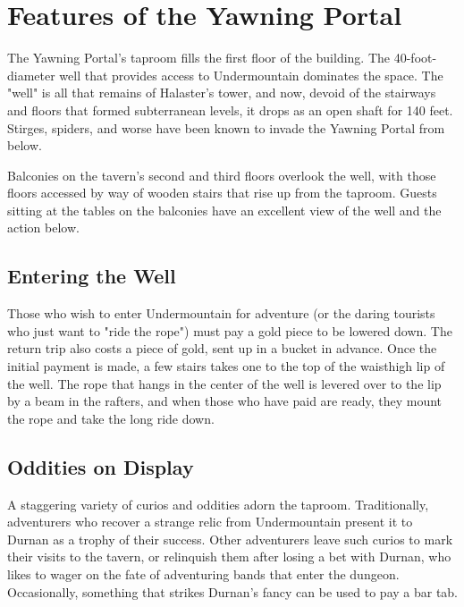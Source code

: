 \documentclass[10pt,a4paper,twoside,bg=print,twocolumn,openany,nodeprecatedcode]{dndbook}
\begin{document}
\section{Features of the Yawning Portal}
The Yawning Portal's taproom fills the first floor of the building. The 40-foot-diameter well that provides access to Undermountain dominates the space. The "well" is all that remains of Halaster's tower, and now, devoid of the stairways and floors that formed subterranean levels, it drops as an open shaft for 140 feet. Stirges, spiders, and worse have been known to invade the Yawning Portal from below.

Balconies on the tavern's second and third floors overlook the well, with those floors accessed by way of wooden stairs that rise up from the taproom. Guests sitting at the tables on the balconies have an excellent view of the well and the action below.

\subsection{Entering the Well}
Those who wish to enter Undermountain for adventure (or the daring tourists who just want to "ride the rope") must pay a gold piece to be lowered down. The return trip also costs a piece of gold, sent up in a bucket in advance. Once the initial payment is made, a few stairs takes one to the top of the waisthigh lip of the well. The rope that hangs in the center of the well is levered over to the lip by a beam in the rafters, and when those who have paid are ready, they mount the rope and take the long ride down.

\subsection{Oddities on Display}
A staggering variety of curios and oddities adorn the taproom. Traditionally, adventurers who recover a strange relic from Undermountain present it to Durnan as a trophy of their success. Other adventurers leave such curios to mark their visits to the tavern, or relinquish them after losing a bet with Durnan, who likes to wager on the fate of adventuring bands that enter the dungeon. Occasionally, something that strikes Durnan's fancy can be used to pay a bar tab.
\end{document}

